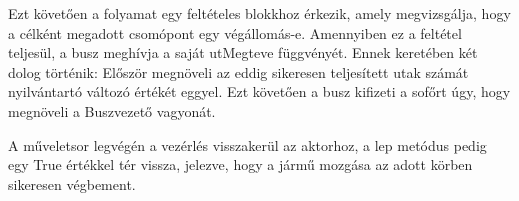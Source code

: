 \begin{szotar}
{                                    \par{Ezt követően a folyamat egy feltételes blokkhoz érkezik, amely megvizsgálja, hogy a célként megadott csomópont egy végállomás-e. Amennyiben ez a feltétel teljesül, a busz meghívja a saját utMegteve függvényét. Ennek keretében két dolog történik: Először megnöveli az eddig sikeresen teljesített utak számát nyilvántartó változó értékét eggyel. Ezt követően a busz kifizeti a sofőrt úgy, hogy megnöveli a Buszvezető vagyonát. }
                                    \par{A műveletsor legvégén a vezérlés visszakerül az aktorhoz, a lep metódus pedig egy True értékkel tér vissza, jelezve, hogy a jármű mozgása az adott körben sikeresen végbement.}}
\end{szotar}


